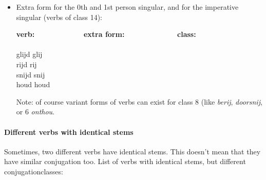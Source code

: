 \begin{itemize}
\item Extra form for the 0th and 1st person singular, and for the imperative 
singular (verbs of class 14):

\begin{tabbing}
{\bf verb:}   \ \ \ \ \ \ \ \ \ \ \ \ \      \=   
{\bf extra form:}  \ \ \ \ \ \ \ \ \ \ \ \ \ \    \=    
{\bf class:} \\
                  \>               \>                   \\
glijd             \> glij          \> [7, 14] \\
rijd              \> rij           \> [7, 14] \\
snijd             \> snij          \> [7, 14] \\
houd              \> houd          \> [5, 14] \\
\end{tabbing}

Note: of course variant forms of verbs can exist for class 8 (like {\em berij},
{\em doorsnij}, or 6 {\em onthou}.
\end{itemize}

\paragraph{Different verbs with identical stems}

Sometimes, two different verbs have identical stems. This doesn't mean that
they have similar conjugation too. List of verbs with
identical stems, but different conjugationclasses:

